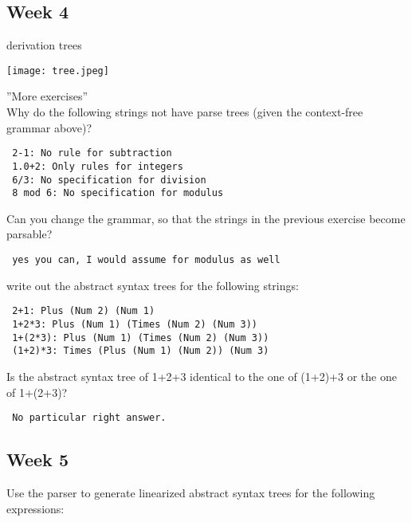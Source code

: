 \documentclass{article}
\theoremstyle{theorem}
\theoremstyle{definition}
\theoremstyle{remark}
\begin{document}
\subsection{Week 4}
{\large derivation trees\\}

\texttt{[image: tree.jpeg]}

{\large ”More exercises”\\}
Why do the following strings not have parse trees (given the context-free grammar above)?

\begin{verbatim}
 2-1: No rule for subtraction
 1.0+2: Only rules for integers
 6/3: No specification for division
 8 mod 6: No specification for modulus
\end{verbatim}

Can you change the grammar, so that the strings in the previous exercise become parsable?

\begin{verbatim}
 yes you can, I would assume for modulus as well
\end{verbatim}

write out the abstract syntax trees for the following strings:
\begin{verbatim}
 2+1: Plus (Num 2) (Num 1)
 1+2*3: Plus (Num 1) (Times (Num 2) (Num 3))
 1+(2*3): Plus (Num 1) (Times (Num 2) (Num 3))
 (1+2)*3: Times (Plus (Num 1) (Num 2)) (Num 3)
\end{verbatim}

Is the abstract syntax tree of 1+2+3 identical to the one of (1+2)+3 or the one of 1+(2+3)?
\begin{verbatim}
 No particular right answer.
\end{verbatim}

\subsection{Week 5} 

Use the parser to generate linearized abstract syntax trees for the following expressions:
\end{document}
